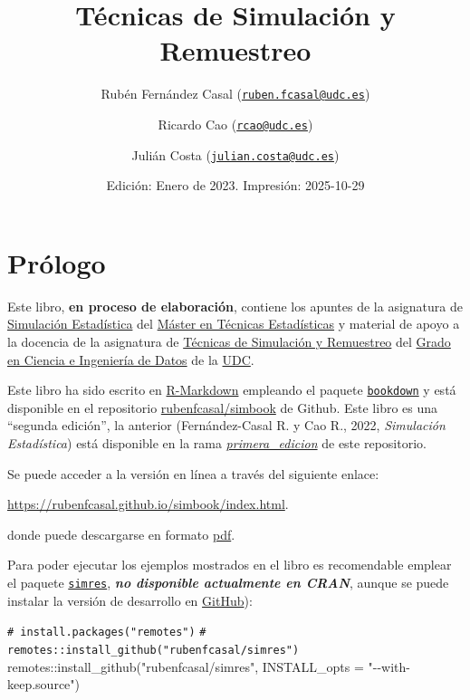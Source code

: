 \documentclass[
  10pt,
]{book}
\title{Técnicas de Simulación y Remuestreo}
\author{Rubén Fernández Casal (\href{mailto:ruben.fcasal@udc.es}{\nolinkurl{ruben.fcasal@udc.es}}) \and Ricardo Cao (\href{mailto:rcao@udc.es}{\nolinkurl{rcao@udc.es}}) \and Julián Costa (\href{mailto:julian.costa@udc.es}{\nolinkurl{julian.costa@udc.es}})}
\date{Edición: Enero de 2023. Impresión: 2025-10-29}
\newenvironment{Shaded}{\begin{snugshade}}{\end{snugshade}}
\newcommand{\AttributeTok}[1]{\textcolor[rgb]{0.77,0.63,0.00}{#1}}
\newcommand{\CommentTok}[1]{\textcolor[rgb]{0.56,0.35,0.01}{\textit{#1}}}
\newcommand{\FunctionTok}[1]{\textcolor[rgb]{0.00,0.00,0.00}{#1}}
\newcommand{\NormalTok}[1]{#1}
\newcommand{\SpecialCharTok}[1]{\textcolor[rgb]{0.00,0.00,0.00}{#1}}
\newcommand{\StringTok}[1]{\textcolor[rgb]{0.31,0.60,0.02}{#1}}
\theoremstyle{break}
\theoremstyle{nonumberplain}
\renewcommand{\CommentTok}[1]{\textcolor[rgb]{0.41,0.41,0.41}{\texttt{#1}}}
\begin{document}
\maketitle

{
\setcounter{tocdepth}{1}
\tableofcontents
}
\hypertarget{pruxf3logo}{%
\chapter*{Prólogo}\label{pruxf3logo}}

Este libro, \textbf{en proceso de elaboración}, contiene los apuntes de la asignatura de \href{http://eamo.usc.es/pub/mte/index.php/es/?option=com_content\&view=article\&id=2201\&idm=13\&a\%C3\%B1o=2019}{Simulación Estadística} del \href{http://eio.usc.es/pub/mte}{Máster en Técnicas Estadísticas} y material de apoyo a la docencia de la asignatura de \href{https://guiadocente.udc.es/guia_docent/index.php?centre=614\&ensenyament=614G02\&assignatura=614G02036\&idioma=cast}{Técnicas de Simulación y Remuestreo} del \href{https://estudos.udc.es/es/study/start/614G02V01}{Grado en Ciencia e Ingeniería de Datos} de la \href{https://www.udc.es}{UDC}.

Este libro ha sido escrito en \href{http://rmarkdown.rstudio.com}{R-Markdown} empleando el paquete \href{https://bookdown.org/yihui/bookdown/}{\texttt{bookdown}} y está disponible en el repositorio \href{https://github.com/rubenfcasal/simbook}{rubenfcasal/simbook} de Github.
Este libro es una ``segunda edición'', la anterior (Fernández-Casal R. y Cao R., 2022, \emph{Simulación Estadística}) está disponible en la rama \emph{\href{https://github.com/rubenfcasal/simbook/tree/primera_edicion}{primera\_edicion}} de este repositorio.

Se puede acceder a la versión en línea a través del siguiente enlace:

\url{https://rubenfcasal.github.io/simbook/index.html}.

donde puede descargarse en formato \href{https://rubenfcasal.github.io/simbook/Simulacion.pdf}{pdf}.

Para poder ejecutar los ejemplos mostrados en el libro es recomendable emplear el paquete \href{https://rubenfcasal.github.io/simres}{\texttt{simres}}, \textbf{\emph{no disponible actualmente en CRAN}}, aunque se puede instalar la versión de desarrollo en \href{https://github.com/rubenfcasal/simres}{GitHub}):

\begin{Shaded}
\begin{Highlighting}[]
\CommentTok{\# install.packages("remotes")}
\CommentTok{\# remotes::install\_github("rubenfcasal/simres")}
\NormalTok{remotes}\SpecialCharTok{::}\FunctionTok{install\_github}\NormalTok{(}\StringTok{"rubenfcasal/simres"}\NormalTok{, }\AttributeTok{INSTALL\_opts =} \StringTok{"{-}{-}with{-}keep.source"}\NormalTok{)}
\end{Highlighting}
\end{Shaded}
\end{document}
